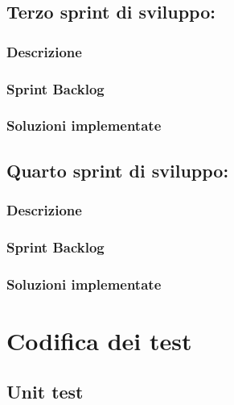 \subsection{Terzo sprint di sviluppo: }
\subsubsection*{Descrizione}
\subsubsection*{Sprint Backlog}
\subsubsection*{Soluzioni implementate}

\subsection{Quarto sprint di sviluppo: }
\subsubsection*{Descrizione}
\subsubsection*{Sprint Backlog}
\subsubsection*{Soluzioni implementate}

\section{Codifica dei test}
\subsection{Unit test}
